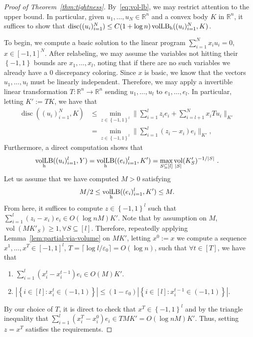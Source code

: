 \documentclass[12pt]{article}
\newcommand{\R}{{\mathbb{R}}}
\newcommand\eps{\varepsilon}
\newcommand{\set}[1]{\left\{ #1 \right\}}
\DeclareMathOperator{\vollb}{volLB}
\DeclareMathOperator{\disc}{disc}
\DeclareMathOperator{\vol}{vol}
\begin{document}
\begin{proof}[Proof of Theorem~\ref{thm:tightness}]
By~\eqref{eq:vol-lb}, we may restrict attention to the upper bound. In particular,
given $u_1,\dots,u_N \in \R^n$ and a convex body $K$ in $\R^n$, it suffices to
show that $\disc((u_i)_{i=1}^N) \leq C(1+\log n)\vollb_{\rm h}((u_i)_{i=1}^N,K)$.  

To begin, we compute a basic solution to the linear program $\sum_{i=1}^N x_i
u_i = 0$, $x \in [-1,1]^N$. After relabeling, we may assume the variables not
hitting their $\set{-1,1}$ bounds are $x_1,\dots,x_l$, noting that if there are
no such variables we already have a $0$ discrepancy coloring. Since
$x$ is basic, we know that the vectors $u_1,\dots,u_l$ must be linearly
independent. Therefore, we may apply a invertible linear
transformation $T:\R^n \rightarrow \R^n$ sending $u_1,\dots,u_l$ to
$e_1,\dots,e_l$. In particular, letting $K' := TK$, we have that 
\begin{align*}
\disc((u_i)_{i=1}^N,K) &\leq \min_{z \in \set{-1,1}^l} \|\sum_{i=1}^l z_i e_i +
\sum_{i=l+1}^N x_i T u_i\|_{K'} \\
                &= \min_{z \in \set{-1,1}^l} \|\sum_{i=1}^l (z_i-x_i)e_i\|_{K'}, 
\end{align*}
Furthermore, a direct computation shows that
\[
\vollb_{\rm h}((u_i)_{i=1}^l,Y) = \vollb_{\rm h}((e_i)_{i=1}^l,K') = \max_{S \subseteq [l]}
\vol_{|S|}(K'_S)^{-1/|S|} \text{ .}
\] 
Let us assume that we have computed $M > 0$ satisfying 
\[
M/2 \leq \vollb_{\rm h}((e_i)_{i=1}^l,K') \leq M. 
\]
From here, it suffices to compute $z \in
\set{-1,1}^l$ such that $\sum_{i=1}^l (z_i-x_i) e_i \in O(\log n M) K'$. Note
that by assumption on $M$, $\vol(MK'_S) \geq 1, \forall S \subseteq [l]$.
Therefore, repeatedly applying Lemma~\ref{lem:partial-via-volume} on $MK'$, letting $x^0 := x$ we compute a sequence
$x^1,\dots,x^T \in [-1,1]^l$, $T = \lceil \log l/\eps_0
\rceil = O(\log n)$, such that $\forall t \in [T]$, we have that

\begin{enumerate}
\item $\sum_{i=1}^l (x^t_i-x^{t-1}_i)e_i \in O(M) K'$.
\item $|\set{i \in [l]: x^t_i \in (-1,1)}| \leq (1-\eps_0)|\set{i \in [l]:
x^{t-1}_i \in (-1,1)}|$.
\end{enumerate}

By our choice of $T$, it is direct to check that $x^T \in \set{-1,1}^l$ and by
the triangle inequality that $\sum_{i=1}^l (x^T_i-x^0_i)e_i \in T M K' = O(\log n
M) K'$. Thus, setting $z = x^T$ satisfies the requirements.


\end{proof}
\end{document}
